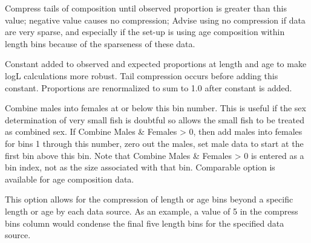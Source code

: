 
Compress tails of composition until observed proportion is greater than this value; negative value causes no compression; Advise using no compression if data are very sparse, and especially if the set-up is using age composition within length bins because of the sparseness of these data.

Constant added to observed and expected proportions at length and age to make logL calculations more robust.  Tail compression occurs before adding this constant.  Proportions are renormalized to sum to 1.0 after constant is added.

Combine males into females at or below this bin number.  This is useful if the sex determination of very small fish is doubtful so allows the small fish to be treated as combined sex.  If Combine Males \& Females > 0, then add males into females for bins 1 through this number, zero out the males, set male data to start at the first bin above this bin.  Note that Combine Males \& Females > 0 is entered as a bin index, not as the size associated with that bin.  Comparable option is available for age composition data.

This option allows for the compression of length or age bins beyond a specific length or age by each data source.  As an example,  a value of 5 in the compress bins column would condense the final five length bins for the specified data source.

